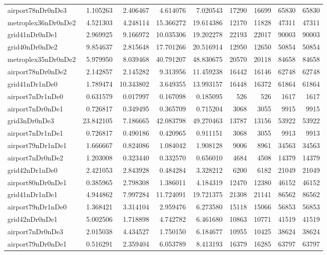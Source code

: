 \begin{longtable}{|l|r|r|r|r|r|r|r|r|}
airport78nDr0nDe3 & 1.105263 & 2.406467 & 4.614076 & 7.020543 & 17290 & 16699 & 65830 & 65830 \\
metroplex36nDr0nDe2 & 4.521303 & 4.248114 & 15.366272 & 19.614386 & 12170 & 11828 & 47311 & 47311 \\
grid41nDr0nDe1 & 2.969925 & 9.166972 & 10.035306 & 19.202278 & 22193 & 22017 & 90003 & 90003 \\
grid40nDr0nDe2 & 9.854637 & 2.815648 & 17.701266 & 20.516914 & 12950 & 12650 & 50854 & 50854 \\
metroplex35nDr0nDe2 & 5.979950 & 8.039468 & 40.791207 & 48.830675 & 20570 & 20118 & 84658 & 84658 \\
airport78nDr0nDe2 & 2.142857 & 2.145282 & 9.313956 & 11.459238 & 16442 & 16146 & 62748 & 62748 \\
grid41nDr1nDe0 & 1.789474 & 10.343802 & 3.649355 & 13.993157 & 16448 & 16372 & 61864 & 61864 \\
airport7nDr1nDe0 & 0.631579 & 0.017997 & 0.167098 & 0.185095 & 526 & 526 & 1617 & 1617 \\
airport7nDr0nDe1 & 0.726817 & 0.349495 & 0.365709 & 0.715204 & 3068 & 3055 & 9915 & 9915 \\
grid3nDr0nDe3 & 23.842105 & 7.186665 & 42.083798 & 49.270463 & 13787 & 13156 & 53922 & 53922 \\
airport7nDr1nDe1 & 0.726817 & 0.490186 & 0.420965 & 0.911151 & 3068 & 3055 & 9913 & 9913 \\
airport79nDr1nDe1 & 1.666667 & 0.824086 & 1.084042 & 1.908128 & 9006 & 8961 & 34563 & 34563 \\
airport7nDr0nDe2 & 1.203008 & 0.323440 & 0.332570 & 0.656010 & 4684 & 4508 & 14379 & 14379 \\
grid42nDr1nDe0 & 2.421053 & 2.843928 & 0.484284 & 3.328212 & 6200 & 6182 & 21049 & 21049 \\
airport80nDr0nDe1 & 0.385965 & 2.798308 & 1.386011 & 4.184319 & 12470 & 12380 & 46152 & 46152 \\
grid41nDr1nDe1 & 4.944862 & 7.997284 & 11.724091 & 19.721375 & 21308 & 21141 & 86562 & 86562 \\
airport79nDr1nDe0 & 1.368421 & 3.314104 & 2.959476 & 6.273580 & 15118 & 15066 & 56853 & 56853 \\
grid42nDr0nDe1 & 5.002506 & 1.718898 & 4.742782 & 6.461680 & 10863 & 10771 & 41519 & 41519 \\
airport7nDr0nDe3 & 2.015038 & 4.434527 & 1.750150 & 6.184677 & 10955 & 10425 & 38624 & 38624 \\
airport79nDr0nDe1 & 0.516291 & 2.359404 & 6.053789 & 8.413193 & 16379 & 16285 & 63797 & 63797 \\

\end{longtable}
